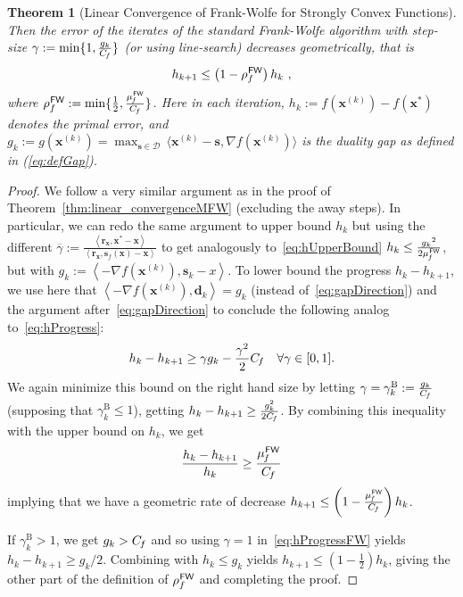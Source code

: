 \documentclass{article} %
\newtheorem{theorem}[definition]{Theorem}
\newcommand{\domain}{\mathcal{D}}
\newcommand{\stepsize}{\gamma}
\newcommand{\stepbound}{\stepsize^\textrm{B}} %
\newcommand{\FW}{{\hspace{0.05em}\textsf{FW}}}
\newcommand{\Cf}{C_{\hspace{-0.08em}f}}
\newcommand{\strongConvFW}{\mu_{\hspace{-0.08em}f}^\FW}
\newcommand{\x}{\bm{x}}
\newcommand{\s}{\bm{s}}
\newcommand{\dd}{\bm{d}}
\renewcommand{\r}{\bm{r}}
\newcommand{\innerProd}[2]{\left\langle #1 , #2 \right\rangle}
\newcommand{\0}{\mathbf{0}} %
\begin{document}
{\begin{theorem}[Linear Convergence of Frank-Wolfe for Strongly Convex Functions]
Then the error of the iterates of the standard Frank-Wolfe algorithm with step-size $\stepsize := \min\{1, \frac{g_k}{\Cf} \}$ (or using line-search) decreases geometrically, that is
\[
h_{k+1} \leq \left(1-\rho_f^\FW\right) h_k \ , 
\]
where $\rho_f^\FW := \min \{\frac{1}{2}, \frac{\strongConvFW}{\Cf} \}$.
Here in each iteration, $h_k := f(\x^{(k)}) - f(\x^*)$ denotes the primal error, and $g_k :=  g(\x^{(k)}) = \displaystyle\max_{\s \in \domain} \,\big\langle \x^{(k)} - \s, \nabla f(\x^{(k)}) \big\rangle$ is the duality gap as defined in (\ref{eq:defGap}).
\end{theorem}
\begin{proof}
We follow a very similar argument as in the proof of Theorem~\ref{thm:linear_convergenceMFW} (excluding the away steps). In particular, we can redo the same argument to upper bound $h_k$ but using the different $\overline\stepsize := \frac{\innerProd{\r_{\x}}{\x^*-\x} }{\innerProd{\r_{\x}}{\s_f(\x) - \x} }$ to get analogously to~\eqref{eq:hUpperBound} $h_k \leq  \frac{{g_k}^2}{2\strongConvFW}$, but with  $g_k :=  \innerProd{-\nabla f(\x^{(k)})}{\s_k - x}$. To lower bound the progress $h_k - h_{k+1}$, we use here that $\innerProd{-\nabla f(\x^{(k)})}{\dd_k} = g_k$ (instead of~\eqref{eq:gapDirection}) and the argument after~\eqref{eq:gapDirection} to conclude the following analog to~\eqref{eq:hProgress}:
\begin{equation} \label{eq:hProgressFW}
h_k - h_{k+1} \ge \stepsize g_k - \frac{\stepsize^2}{2} \Cf \quad \forall \stepsize \in [0,1].  
\end{equation}
We again minimize this bound on the right hand size by letting $\stepsize = \stepbound_k := \frac{g_k}{\Cf}$ (supposing that $\stepbound_k \leq 1$), getting $h_k - h_{k+1} \geq  \frac{g_k^2}{2\Cf}$. By combining this inequality with the upper bound on $h_k$, we get 
$$
\frac{h_k - h_{k+1} }{h_k} \ge \frac{\strongConvFW}{\Cf}
$$
implying that we have a geometric rate of decrease $h_{k+1} \leq \left(1-\frac{\strongConvFW}{\Cf}\right) h_k$.

If $\stepbound_k > 1$, we get $g_k > \Cf$ and so using $\stepsize = 1$ in~\eqref{eq:hProgressFW} yields $h_k - h_{k+1} \geq g_k/2$. Combining with $h_k \leq g_k$ yields $h_{k+1} \leq (1-\frac{1}{2}) h_k$, giving the other part of the definition of $\rho_f^\FW$ and completing the proof.
\end{proof}

} %
\end{document}
